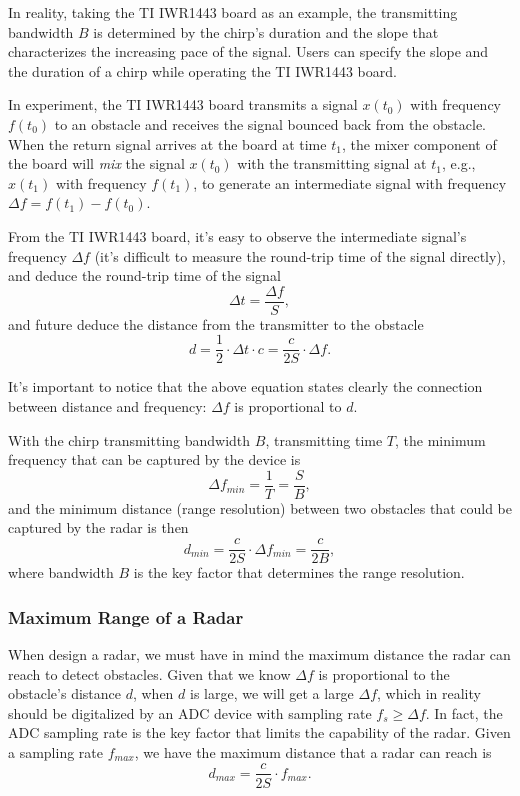 \documentclass[11pt, oneside]{article}   	%
\begin{document}
In reality, taking the TI IWR1443 board as an example, the transmitting bandwidth $B$ is determined by the chirp's duration and the slope that characterizes the increasing pace of the signal. Users can specify the slope and the duration of a chirp while operating the TI IWR1443 board.

In experiment, the TI IWR1443 board transmits a signal $x(t_0)$ with frequency $f(t_0)$ to an obstacle and receives the signal bounced back from the obstacle. When the return signal arrives at the board at time $t_1$, the mixer component of the board will \emph{mix} the signal $x(t_0)$ with the transmitting signal at $t_1$, e.g., $x(t_1)$ with frequency $f(t_1)$, to generate an intermediate signal with frequency $\Delta f = f(t_1) - f(t_0)$. 

From the TI IWR1443 board, it's easy to observe the intermediate signal's frequency $\Delta f$ (it's difficult to measure the round-trip time of the signal directly), and deduce the round-trip time of the signal 
$$\Delta t = \frac{\Delta f}{S},$$
and future deduce the distance from the transmitter to the obstacle 
$$d = \frac{1}{2}\cdot \Delta t \cdot c = \frac{c}{2S}\cdot \Delta f.$$

It's important to notice that the above equation states clearly the connection between distance and frequency: $\Delta f$ is proportional to $d$.

With the chirp transmitting bandwidth $B$, transmitting time $T$, the minimum frequency that can be captured by the device is 
$$\Delta f_{min} = \frac{1}{T} = \frac{S}{B}, $$ and the minimum distance (range resolution) between two obstacles that could be captured by the radar is then 
$$d_{min} = \frac{c}{2S}\cdot \Delta f_{min} = \frac{c}{2B},$$
where bandwidth $B$ is the key factor that determines the range resolution.

\subsubsection{Maximum Range of a Radar}
When design a radar, we must have in mind the maximum distance the radar can reach to detect obstacles. Given that we know $\Delta f$ is proportional to the obstacle's distance $d$, when $d$ is large, we will get a large $\Delta f$,  which in reality should be digitalized by an ADC device with sampling rate $f_s \ge \Delta f$. In fact, the ADC sampling rate is the key factor that limits the capability of the radar. Given a sampling rate $f_{max}$, we have the maximum distance that a radar can reach is 
$$d_{max} = \frac{c}{2S}\cdot  f_{max}.$$
\end{document}

